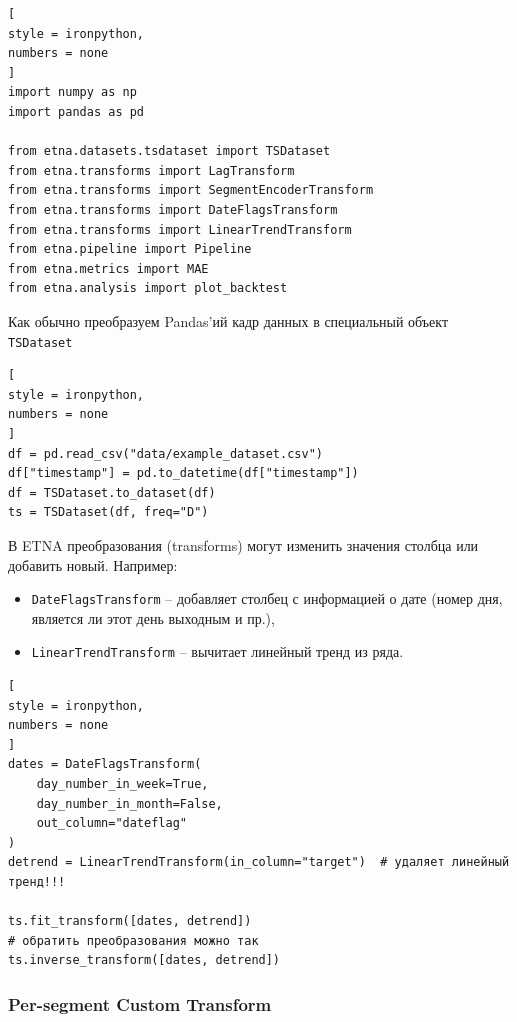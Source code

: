 \documentclass[%
	11pt,
	a4paper,
	utf8,
		]{article}
\begin{document}
\begin{lstlisting}[
style = ironpython,
numbers = none
]
import numpy as np
import pandas as pd

from etna.datasets.tsdataset import TSDataset
from etna.transforms import LagTransform
from etna.transforms import SegmentEncoderTransform
from etna.transforms import DateFlagsTransform
from etna.transforms import LinearTrendTransform
from etna.pipeline import Pipeline
from etna.metrics import MAE
from etna.analysis import plot_backtest
\end{lstlisting}

Как обычно преобразуем Pandas'ий кадр данных в специальный объект \verb|TSDataset|
\begin{lstlisting}[
style = ironpython,
numbers = none
]
df = pd.read_csv("data/example_dataset.csv")
df["timestamp"] = pd.to_datetime(df["timestamp"])
df = TSDataset.to_dataset(df)
ts = TSDataset(df, freq="D")
\end{lstlisting}

В ETNA преобразования (transforms) могут изменить значения столбца или добавить новый. Например:
\begin{itemize}
	\item \verb|DateFlagsTransform| -- добавляет столбец с информацией о дате (номер дня, является ли этот день выходным и пр.),
	
	\item \verb|LinearTrendTransform| -- вычитает линейный тренд из ряда.
\end{itemize}
  
\begin{lstlisting}[
style = ironpython,
numbers = none
]
dates = DateFlagsTransform(
    day_number_in_week=True,
    day_number_in_month=False,
    out_column="dateflag"
)
detrend = LinearTrendTransform(in_column="target")  # удаляет линейный тренд!!!

ts.fit_transform([dates, detrend])
# обратить преобразования можно так
ts.inverse_transform([dates, detrend])
\end{lstlisting}

\subsubsection{Per-segment Custom Transform}
\end{document}
